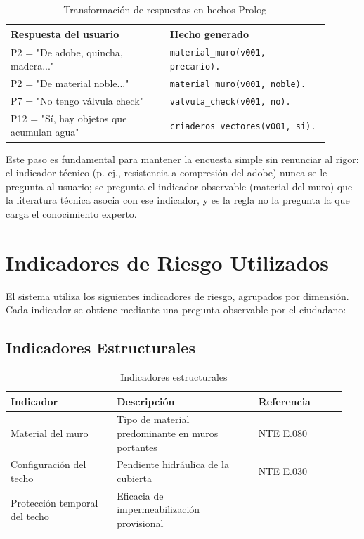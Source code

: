 \documentclass[12pt, letterpaper]{article}
\begin{document}
\begin{table}[H]
\centering
\caption{Transformación de respuestas en hechos Prolog}
\label{tab:transformacion}
\begin{tabular}{@{}p{0.45\linewidth}p{0.45\linewidth}@{}}
\toprule
\textbf{Respuesta del usuario} & \textbf{Hecho generado} \\ \midrule
P2 = "De adobe, quincha, madera..." & \texttt{material\_muro(v001, precario).} \\
P2 = "De material noble..." & \texttt{material\_muro(v001, noble).} \\
P7 = "No tengo válvula check" & \texttt{valvula\_check(v001, no).} \\
P12 = "Sí, hay objetos que acumulan agua" & \texttt{criaderos\_vectores(v001, si).} \\ \bottomrule
\end{tabular}
\end{table}

Este paso es fundamental para mantener la encuesta simple sin renunciar al rigor: el indicador técnico (p. ej., resistencia a compresión del adobe) nunca se le pregunta al usuario; se pregunta el indicador observable (material del muro) que la literatura técnica asocia con ese indicador, y es la regla no la pregunta la que carga el conocimiento experto.

\section{Indicadores de Riesgo Utilizados}

El sistema utiliza los siguientes indicadores de riesgo, agrupados por dimensión. Cada indicador se obtiene mediante una pregunta observable por el ciudadano:

\subsection{Indicadores Estructurales}

\begin{table}[H]
\centering
\caption{Indicadores estructurales}
\label{tab:ind_estructurales}
\begin{tabular}{@{}p{0.3\linewidth}p{0.4\linewidth}p{0.25\linewidth}@{}}
\toprule
\textbf{Indicador} & \textbf{Descripción} & \textbf{Referencia} \\ \midrule
Material del muro & Tipo de material predominante en muros portantes & NTE E.080 \parencite{min_vivienda_rne} \\
Configuración del techo & Pendiente hidráulica de la cubierta & NTE E.030 \parencite{min_vivienda_rne} \\
Protección temporal del techo & Eficacia de impermeabilización provisional & \parencite{typsa_drenaje} \\ \bottomrule
\end{tabular}
\end{table}
\end{document}
